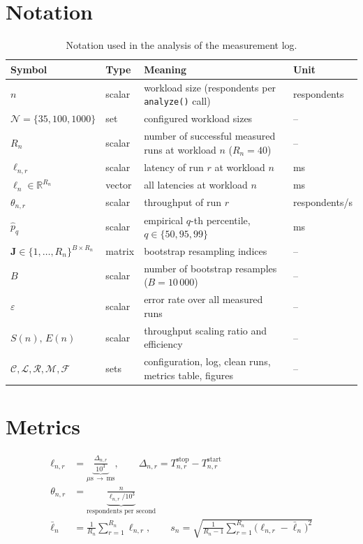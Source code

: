 \documentclass[10pt]{article}
\begin{document}
\section*{Notation}
\begin{table}[h]
\centering
\caption{Notation used in the analysis of the measurement log.}
\label{tab:notation}
\begin{tabular}{@{}llp{7.2cm}l@{}}
\toprule
Symbol & Type & Meaning & Unit \\
\midrule
$n$ & scalar & workload size (respondents per \texttt{analyze()} call) & respondents \\
$\mathcal{N}=\{35,100,1000\}$ & set & configured workload sizes & -- \\
$R_n$ & scalar & number of successful measured runs at workload $n$ ($R_n=40$) & -- \\
$\ell_{n,r}$ & scalar & latency of run $r$ at workload $n$ & ms \\
$\boldsymbol{\ell}_n\in\mathbb{R}^{R_n}$ & vector & all latencies at workload $n$ & ms \\
$\theta_{n,r}$ & scalar & throughput of run $r$ & respondents/s \\
$\hat p_q$ & scalar & empirical $q$-th percentile, $q\in\{50,95,99\}$ & ms \\
$\mathbf{J}\in\{1,\dots,R_n\}^{B\times R_n}$ & matrix & bootstrap resampling indices & -- \\
$B$ & scalar & number of bootstrap resamples ($B=10\,000$) & -- \\
$\varepsilon$ & scalar & error rate over all measured runs & -- \\
$S(n),\,E(n)$ & scalar & throughput scaling ratio and efficiency & -- \\
$\mathcal{C},\mathcal{L},\mathcal{R},\mathcal{M},\mathcal{F}$ & sets & configuration, log, clean runs, metrics table, figures & -- \\
\bottomrule
\end{tabular}
\end{table}

\section*{Metrics}
\begin{align}
\ell_{n,r} &= \underbrace{\frac{\Delta_{n,r}}{10^{3}}}_{\mu\mathrm{s}\,\to\,\mathrm{ms}},
\qquad \Delta_{n,r}=T^{\mathrm{stop}}_{n,r}-T^{\mathrm{start}}_{n,r}
\label{eq:latency}\\
\theta_{n,r} &= \underbrace{\frac{n}{\ell_{n,r}/10^{3}}}_{\text{respondents per second}}
\label{eq:throughput}\\
\bar\ell_n &= \frac{1}{R_n}\sum_{r=1}^{R_n}\ell_{n,r},
\qquad
s_n=\sqrt{\frac{1}{R_n-1}\sum_{r=1}^{R_n}\bigl(\ell_{n,r}-\bar\ell_n\bigr)^{2}}
\label{eq:meansd}
\end{align}
\end{document}
